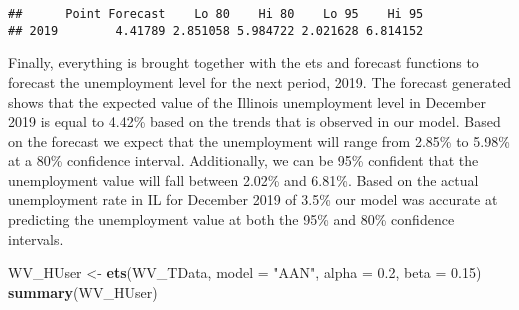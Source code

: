 \documentclass[
]{article}
\newenvironment{Shaded}{\begin{snugshade}}{\end{snugshade}}
\newcommand{\CommentTok}[1]{\textcolor[rgb]{0.56,0.35,0.01}{\textit{#1}}}
\newcommand{\DataTypeTok}[1]{\textcolor[rgb]{0.13,0.29,0.53}{#1}}
\newcommand{\DecValTok}[1]{\textcolor[rgb]{0.00,0.00,0.81}{#1}}
\newcommand{\FloatTok}[1]{\textcolor[rgb]{0.00,0.00,0.81}{#1}}
\newcommand{\KeywordTok}[1]{\textcolor[rgb]{0.13,0.29,0.53}{\textbf{#1}}}
\newcommand{\NormalTok}[1]{#1}
\newcommand{\OperatorTok}[1]{\textcolor[rgb]{0.81,0.36,0.00}{\textbf{#1}}}
\newcommand{\StringTok}[1]{\textcolor[rgb]{0.31,0.60,0.02}{#1}}
\begin{document}
\begin{verbatim}
##      Point Forecast    Lo 80    Hi 80    Lo 95    Hi 95
## 2019        4.41789 2.851058 5.984722 2.021628 6.814152
\end{verbatim}

Finally, everything is brought together with the ets and forecast
functions to forecast the unemployment level for the next period, 2019.
The forecast generated shows that the expected value of the Illinois
unemployment level in December 2019 is equal to 4.42\% based on the
trends that is observed in our model. Based on the forecast we expect
that the unemployment will range from 2.85\% to 5.98\% at a 80\%
confidence interval. Additionally, we can be 95\% confident that the
unemployment value will fall between 2.02\% and 6.81\%. Based on the
actual unemployment rate in IL for December 2019 of 3.5\% our model was
accurate at predicting the unemployment value at both the 95\% and 80\%
confidence intervals.

\begin{Shaded}
\end{Shaded}

\begin{Shaded}
\begin{Highlighting}[]
\NormalTok{WV_HUser <-}\StringTok{ }\KeywordTok{ets}\NormalTok{(WV_TData, }\DataTypeTok{model =} \StringTok{"AAN"}\NormalTok{, }\DataTypeTok{alpha =} \FloatTok{0.2}\NormalTok{, }\DataTypeTok{beta =} \FloatTok{0.15}\NormalTok{)}
\KeywordTok{summary}\NormalTok{(WV_HUser)}
\end{Highlighting}
\end{Shaded}
\end{document}
